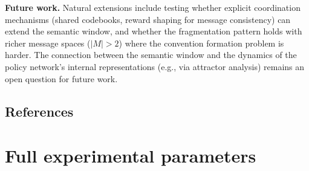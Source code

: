 \documentclass[
  10pt,
  letterpaper,
]{article}
\begin{document}
\textbf{Future work.} Natural extensions include testing whether
explicit coordination mechanisms (shared codebooks, reward shaping for
message consistency) can extend the semantic window, and whether the
fragmentation pattern holds with richer message spaces (\(|M| > 2\))
where the convention formation problem is harder. The connection between
the semantic window and the dynamics of the policy network's internal
representations (e.g., via attractor analysis) remains an open question
for future work.



\hypertarget{references}{%
\subsection*{References}\label{references}}

\renewcommand{\bibsection}{}


\appendix

\hypertarget{sec-app-params}{%
\section{Full experimental parameters}\label{sec-app-params}}
\end{document}
